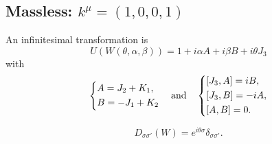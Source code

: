 \subsection{\texorpdfstring{Massless: $k^\mu = (1, 0, 0, 1)$}{Massless: k = (1,0,0,1)}}
An infinitesimal transformation is
\begin{equation}
    U(W(\theta, \alpha, \beta)) = 1 + i \alpha A + i \beta B + i \theta J_3
\end{equation}
with
\begin{equation}
    \begin{dcases}
        A = J_2 + K_1, \\
        B = - J_1 + K_2
    \end{dcases}
    \quad \text{and} \quad
    \begin{dcases}
        [J_3, A] = i B, \\
        {}[J_3, B] = - i A, \\
        {}[A, B] = 0.
    \end{dcases}
\end{equation}
\begin{framed}
    \begin{equation}
        D_{\sigma \sigma'} (W) = e^{i \theta \sigma} \delta_{\sigma \sigma'}.
    \end{equation}
\end{framed}
